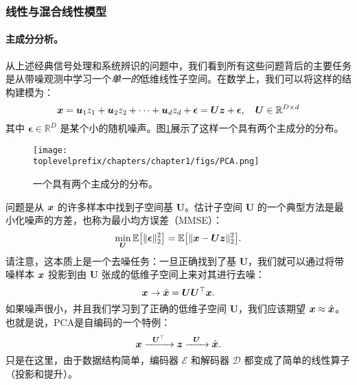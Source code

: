 \documentclass[../../book-main.tex]{subfiles}
\begin{document}

\subsubsection{线性与混合线性模型}
\label{sec:PCA-ICA}
\paragraph{主成分分析。}
从上述经典信号处理和系统辨识的问题中，我们看到所有这些问题背后的主要任务是从带噪观测中学习一个{\em 单一的}低维线性子空间。在数学上，我们可以将这样的结构建模为：
\begin{equation}
    \bm{x} = \boldsymbol{u}_1 z_1 + \boldsymbol{u}_2 z_2 + \cdots + \boldsymbol{u}_d z_d + \boldsymbol{\epsilon} =  \boldsymbol{U} \bm{z} + \boldsymbol{\epsilon}, \quad \boldsymbol{U} \in \mathbb{R}^{D\times d}
    \label{eqn:PCA-model}
\end{equation}
其中 $\boldsymbol{\epsilon} \in \mathbb{R}^D$ 是某个小的随机噪声。图\ref{fig:PCA}展示了这样一个具有两个主成分的分布。
\begin{figure}
    \centering
    \texttt{[image: \\toplevelprefix/chapters/chapter1/figs/PCA.png]}
    \caption{一个具有两个主成分的分布。}
    \label{fig:PCA}
\end{figure}
问题是从 $\bm{x}$ 的许多样本中找到子空间基 $\boldsymbol{U}$。估计子空间 $\boldsymbol{U}$ 的一个典型方法是最小化噪声的方差，也称为最小均方误差（MMSE）：
\begin{equation}
    \min_{\boldsymbol{U}} \mathbb{E}\big[\|\boldsymbol{\epsilon}\|_2^2\big] = \mathbb{E}\big[\|\bm{x} - \boldsymbol{U} \bm{z}\|_2^2\big].
\end{equation}
请注意，这本质上是一个去噪任务：一旦正确找到了基 $\boldsymbol{U}$，我们就可以通过将带噪样本 $\bm{x}$ 投影到由 $\boldsymbol{U}$ 张成的低维子空间上来对其进行去噪：
\begin{equation}
\bm{x} \rightarrow \hat {\bm{x}} = \boldsymbol{U}\boldsymbol{U}^\top \bm{x}. 
\end{equation}
如果噪声很小，并且我们学习到了正确的低维子空间 $\boldsymbol{U}$，我们应该期望 $\bm{x} \approx \hat {\bm{x}}$。也就是说，PCA是自编码的一个特例：
\begin{equation}
    \bm{x}   \xrightarrow{\hspace{2mm} \boldsymbol{U}^\top\hspace{2mm}} \bm{z}  \xrightarrow{\hspace{2mm} \boldsymbol{U} \hspace{2mm}} \hat {\bm{x}}.
       \label{eqn:auto-encoding-PCA}
\end{equation}
只是在这里，由于数据结构简单，编码器 $\mathcal{E}$ 和解码器 $\mathcal{D}$ 都变成了简单的线性算子（投影和提升）。
\end{document}
